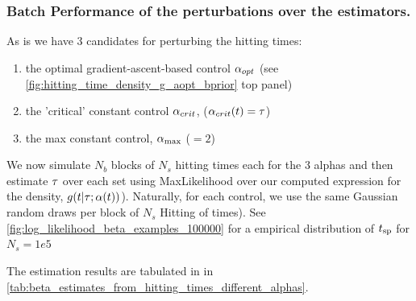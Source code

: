 \documentclass{article}
\begin{document}
\subsubsection{Batch Performance of the perturbations over the estimators.}
As is we have 3 candidates for perturbing the hitting times: 
\begin{enumerate}
  \item 
the optimal gradient-ascent-based  control ${\alpha}_{opt}$ (see
\cref{fig:hitting_time_density_g_aopt_bprior} top panel)
\item   the 'critical' constant control
${\alpha}_{crit}$, (${\alpha}_{crit}(t) =  { \tau }$)
\item  the max constant control, ${ {\alpha}_{\textrm{max}} }$ ($=2$)
\end{enumerate} 

We now simulate $N_b $ blocks of $N_s $ hitting times each for the
3 alphas and then estimate ${ \tau }$ over each set using MaxLikelihood over our
computed expression for the density, $g(t|{ \tau }; {\alpha}(t) )$). 
Naturally, for each control, we use the same Gaussian random draws per block of
$N_s$ Hitting of times). See \cref{fig:log_likelihood_beta_examples_100000} for
a empirical distribution of ${ t_{\textrm{sp} } }$ for $N_s = 1e5$

The estimation results are tabulated in in
\cref{tab:beta_estimates_from_hitting_times_different_alphas}.
\end{document}
